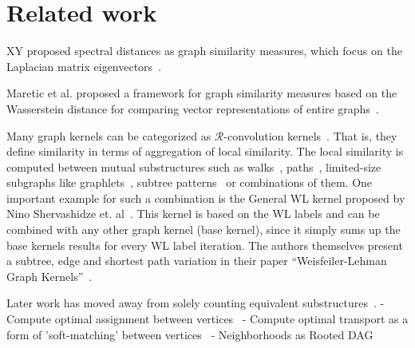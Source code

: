 \section{Related work}\label{sec:related_work} %

XY proposed spectral distances as graph similarity measures, which focus on the Laplacian matrix eigenvectors~\cite{2012_Jovanovic_ELSEVIER, 2018_Gera_Springer}.

Maretic et al. proposed a framework for graph similarity measures based on the Wasserstein distance for comparing vector representations of entire graphs~\cite{2019_Maretic_CONF}.

Many graph kernels can be categorized as $\mathcal{R}$-convolution kernels~\cite{2019_Togninalli_NIPS}. 
That is, they define similarity in terms of aggregation of local similarity.
The local similarity is computed between mutual substructures such as 
walks~\cite{2003_Gaertner_CONF,2003_Kashima_ICML}, paths~\cite{2005_Borgwardt_IEEE}, limited-size subgraphs like graphlets~\cite{2004_Horvath_KDD,2009_Shervashidze_NIPS}, subtree patterns~\cite{2003_Ramon_CONF,2008_Mahe_CONF,2011_Shervashidze_JMLR} or combinations of them. %
One important example for such a combination is the General WL kernel proposed by Nino Shervashidze et. al~\cite{2011_Shervashidze_JMLR}. 
This kernel is based on the WL labels and can be combined with any other
graph kernel (base kernel), since it simply sums up the base kernels results for every WL label iteration. 
The authors themselves present a subtree, edge and shortest path variation in their paper “Weisfeiler-Lehman Graph Kernels”~\cite{2011_Shervashidze_JMLR}. 

Later work has moved away from solely counting equivalent substructures~\cite{2021_Schulz_CONF}.
- Compute optimal assignment between vertices~\cite{2016_Kriege_NIPS}
- Compute optimal transport as a form of 'soft-matching' between vertices~\cite{2019_Togninalli_NIPS}
- Neighborhoods as Rooted DAG %


